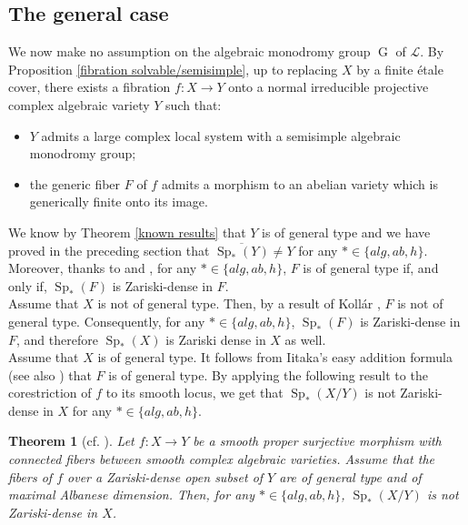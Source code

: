 \documentclass[11pt,letterpaper]{amsart}
\def\cL{\mathcal{L}}
\theoremstyle{plain}
\newtheorem{thm}{Theorem}[section]
\DeclareMathOperator{\Sp}{Sp}
\DeclareMathOperator{\rG}{G}
\begin{document}
\subsection{The general case}
We now make no assumption on the algebraic monodromy group $\rG$ of $\cL$.
By Proposition \ref{fibration solvable/semisimple}, up to replacing $X$ by a finite étale cover, there exists a fibration $f \colon X \to Y$ onto a normal irreducible projective complex algebraic variety $Y$ such that:
\begin{itemize}
\item $Y$ admits a large complex local system with a semisimple algebraic monodromy group;
\item the generic fiber $F$ of $f$ admits a morphism to an abelian variety which is generically finite onto its image.
\end{itemize}
We know by Theorem \ref{known results} that $Y$ is of general type and we have proved in the preceding section that $\overline{\Sp_{\ast}(Y)} \neq Y$ for any $\ast \in \{ alg, ab, h \}$. Moreover, thanks to \cite{Yamanoi-maximal-Albanese} and \cite{Bruni-relative-Lang}, for any $\ast \in \{ alg, ab, h \}$, $F$ is of general type if, and only if, $\Sp_{\ast}(F)$ is Zariski-dense in $F$.\\

Assume that $X$ is not of general type. Then, by a result of Kollár \cite[p.363, Theorem]{Kollar-subadditivity}, $F$ is not of general type. Consequently, for any $\ast \in \{ alg, ab, h \}$, $\Sp_{\ast}(F)$ is Zariski-dense in $F$, and therefore $\Sp_{\ast}(X)$ is Zariski dense in $X$ as well.\\

Assume that $X$ is of general type. It follows from Iitaka’s easy addition formula \cite[Theorem 11.9]{Iitaka-book} (see also \cite[Lemma 2.3.31]{Fujino-book}) that $F$ is of general type. By applying the following result to the corestriction of $f$ to its smooth locus, we get that $\Sp_{\ast}(X/Y)$ is not Zariski-dense in $X$ for any $\ast \in \{ alg, ab, h \}$.

\begin{thm}[cf. \cite{Bruni-relative-Lang}]
Let $f \colon X \to Y$ be a smooth proper surjective morphism with connected fibers between smooth complex algebraic varieties. Assume that the fibers of $f$ over a Zariski-dense open subset of $Y$ are of general type and of maximal Albanese dimension. Then, for any $\ast \in \{ alg, ab, h \}$, $\Sp_{\ast}(X/Y)$ is not Zariski-dense in $X$. 
\end{thm}
\end{document}
